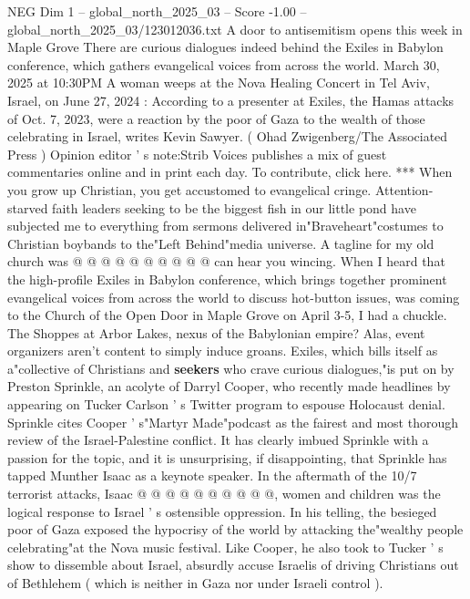 \begin{textsample}{NEG Dim 1 – global\_north\_2025\_03 – Score -1.00 – global\_north\_2025\_03/123012036.txt}  \label{ex:f1_neg_027}
A door to antisemitism opens this week in Maple Grove There are curious dialogues indeed behind the Exiles in Babylon conference, which gathers evangelical voices from across the world.
March 30, 2025 at 10:30PM A woman weeps at the Nova Healing Concert in Tel Aviv, Israel, on June 27, 2024 : According to a presenter at Exiles, the Hamas attacks of Oct. 7, 2023, were a reaction by the poor of Gaza to the wealth of those celebrating in Israel, writes Kevin Sawyer. ( Ohad Zwigenberg/The Associated Press ) Opinion editor ' s note:Strib Voices publishes a mix of guest commentaries online and in print each day.
To contribute, click here. *** When you grow up Christian, you get accustomed to evangelical cringe.
Attention-starved faith leaders seeking to be the biggest fish in our little pond have subjected me to everything from sermons delivered in"Braveheart"costumes to Christian boybands to the"Left Behind"media universe.
A tagline for my old church was @ @ @ @ @ @ @ @ @ @ can hear you wincing.
When I heard that the high-profile Exiles in Babylon conference, which brings together prominent evangelical voices from across the world to discuss hot-button issues, was coming to the Church of the Open Door in Maple Grove on April 3-5, I had a chuckle.
The Shoppes at Arbor Lakes, nexus of the Babylonian empire?
Alas, event organizers aren't content to simply induce groans.
Exiles, which bills itself as a"collective of Christians and \textbf{seekers} who crave curious dialogues,"is put on by Preston Sprinkle, an acolyte of Darryl Cooper, who recently made headlines by appearing on Tucker Carlson ' s Twitter program to espouse Holocaust denial.
Sprinkle cites Cooper ' s"Martyr Made"podcast as the fairest and most thorough review of the Israel-Palestine conflict.
It has clearly imbued Sprinkle with a passion for the topic, and it is unsurprising, if disappointing, that Sprinkle has tapped Munther Isaac as a keynote speaker.
In the aftermath of the 10/7 terrorist attacks, Isaac @ @ @ @ @ @ @ @ @ @, women and children was the logical response to Israel ' s ostensible oppression.
In his telling, the besieged poor of Gaza exposed the hypocrisy of the world by attacking the"wealthy people celebrating"at the Nova music festival.
Like Cooper, he also took to Tucker ' s show to dissemble about Israel, absurdly accuse Israelis of driving Christians out of Bethlehem ( which is neither in Gaza nor under Israeli control ).

\end{textsample}
